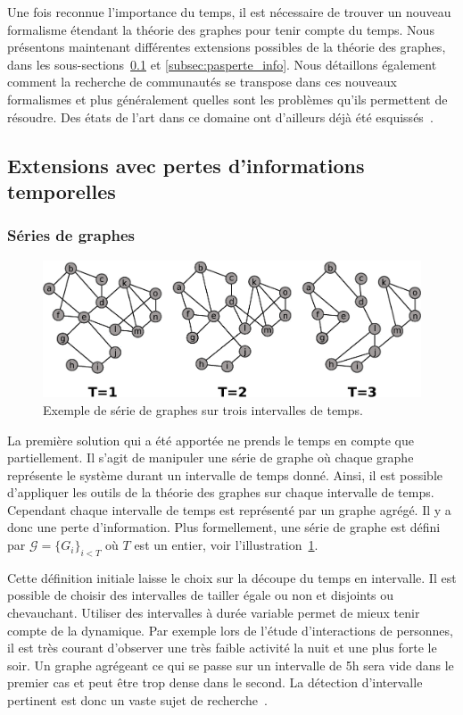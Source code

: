 Une fois reconnue l'importance du temps, il est nécessaire de trouver un nouveau formalisme étendant la théorie des graphes pour tenir compte du temps.
Nous présentons maintenant différentes extensions possibles de la théorie des graphes, dans les sous-sections~\ref{subsec:perte_info} et \ref{subsec:pasperte_info}.
Nous détaillons également comment la recherche de communautés se transpose dans ces nouveaux formalismes et plus généralement quelles sont les problèmes qu'ils permettent de résoudre.
Des états de l'art dans ce domaine ont d'ailleurs déjà été esquissés~\cite{Boccaletti2014,Cazabet2014,hartmann2014clustering}.

\subsection{Extensions avec pertes d'informations temporelles}
\label{subsec:perte_info}
\subsubsection{Séries de graphes}
\begin{figure}[h]
\centering
\includegraphics[width=0.8\linewidth]{img/Intro/TVG.eps}
\caption{Exemple de série de graphes sur trois intervalles de temps.}
\label{fig:exemple_TVG}
\end{figure}
La première solution qui a été apportée ne prends le temps en compte que partiellement.
Il s'agit de manipuler une série de graphe où chaque graphe représente le système durant un intervalle de temps donné.
Ainsi, il est possible d'appliquer les outils de la théorie des graphes sur chaque intervalle de temps.
Cependant chaque intervalle de temps est représenté par un graphe agrégé.
Il y a donc une perte d'information.
Plus formellement, une série de graphe est défini par $\mathcal{G}=\{G_i\}_{i < T}$ où $T$ est un entier, voir l'illustration~\ref{fig:exemple_TVG}.

Cette définition initiale laisse le choix sur la découpe du temps en intervalle.
Il est possible de choisir des intervalles de tailler égale ou non et disjoints ou chevauchant\cite{Wang2012}.
Utiliser des intervalles à durée variable permet de mieux tenir compte de la dynamique.
Par exemple lors de l'étude d'interactions de personnes, il est très courant d'observer une très faible activité la nuit et une plus forte le soir.
Un graphe agrégeant ce qui se passe sur un intervalle de 5h sera vide dans le premier cas et peut être trop dense dans le second.
La détection d'intervalle pertinent est donc un vaste sujet de recherche~\cite{Rosvall2010,Krings2012,Ribeiro2013,Caceres2013,Peel2015,de2016detection}.

